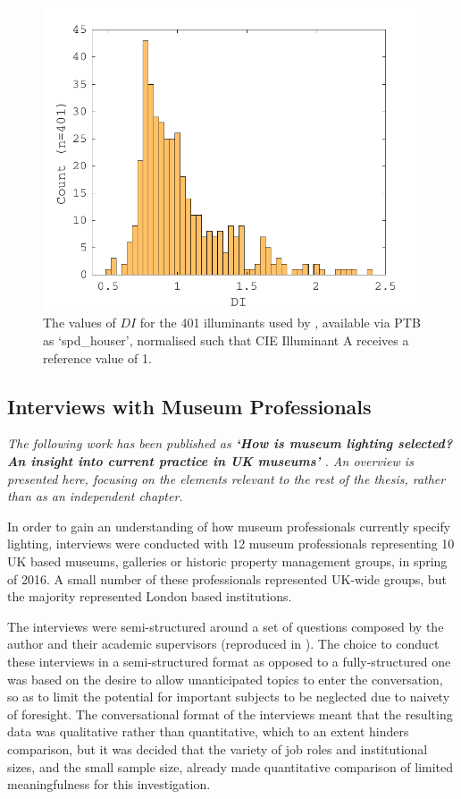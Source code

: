 \begin{figure}[htbp]
\includegraphics[max width=\textwidth]{figs/LitRev/DI.pdf}
\caption{The values of $DI$ for the 401 illuminants used by \citet{houser_review_2013}, available via \gls{PTB} as `spd\_houser', normalised such that \gls{CIE} Illuminant A receives a reference value of 1.}
\label{fig:Houser}
\end{figure}

\subsection{Interviews with Museum Professionals} \label{sec:Interviews}

\textit{The following work has been published as \textbf{`How is museum lighting selected? An insight into current practice in UK museums'} \citep{garside_how_2017}. An overview is presented here, focusing on the elements relevant to the rest of the thesis, rather than as an independent chapter.}

\medskip

In order to gain an understanding of how museum professionals currently specify lighting, interviews were conducted with 12 museum professionals representing 10 UK based museums, galleries or historic property management groups, in spring of 2016. A small number of these professionals represented UK-wide groups, but the majority represented London based institutions.

The interviews were semi-structured around a set of questions composed by the author and their academic supervisors (reproduced in \citet{garside_how_2017}). The choice to conduct these interviews in a semi-structured format as opposed to a fully-structured one was based on the desire to allow unanticipated topics to enter the conversation, so as to limit the potential for important subjects to be neglected due to naivety of foresight. The conversational format of the interviews meant that the resulting data was qualitative rather than quantitative, which to an extent hinders comparison, but it was decided that the variety of job roles and institutional sizes, and the small sample size, already made quantitative comparison of limited meaningfulness for this investigation.

